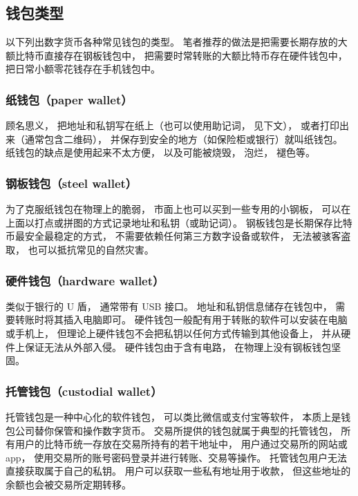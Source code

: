 \subsection{钱包类型}
以下列出数字货币各种常见钱包的类型。 笔者推荐的做法是把需要长期存放的大额比特币直接存在钢板钱包中， 把需要时常转账的大额比特币存在硬件钱包中，把日常小额零花钱存在手机钱包中。

\subsubsection{纸钱包（paper wallet）}
顾名思义， 把地址和私钥写在纸上（也可以使用助记词， 见下文）， 或者打印出来（通常包含二维码）， 并保存到安全的地方（如保险柜或银行）就叫纸钱包。 纸钱包的缺点是使用起来不太方便， 以及可能被烧毁， 泡烂， 褪色等。

\subsubsection{钢板钱包（steel wallet）}
为了克服纸钱包在物理上的脆弱， 市面上也可以买到一些专用的小钢板， 可以在上面以打点或拼图的方式记录地址和私钥（或助记词）。 钢板钱包是长期保存比特币最安全最稳定的方式， 不需要依赖任何第三方数字设备或软件， 无法被骇客盗取， 也可以抵抗常见的自然灾害。

\subsubsection{硬件钱包（hardware wallet）}
类似于银行的 U 盾， 通常带有 USB 接口。 地址和私钥信息储存在钱包中， 需要转账时将其插入电脑即可。 硬件钱包一般配有用于转账的软件可以安装在电脑或手机上， 但理论上硬件钱包不会把私钥以任何方式传输到其他设备上， 并从硬件上保证无法从外部入侵。 硬件钱包由于含有电路， 在物理上没有钢板钱包坚固。

\subsubsection{托管钱包（custodial wallet）}
托管钱包是一种中心化的软件钱包， 可以类比微信或支付宝等软件， 本质上是钱包公司替你保管和操作数字货币。 交易所提供的钱包就属于典型的托管钱包， 所有用户的比特币统一存放在交易所持有的若干地址中， 用户通过交易所的网站或 app， 使用交易所的账号密码登录并进行转账、交易等操作。 托管钱包用户无法直接获取属于自己的私钥。 用户可以获取一些私有地址用于收款， 但这些地址的余额也会被交易所定期转移。

